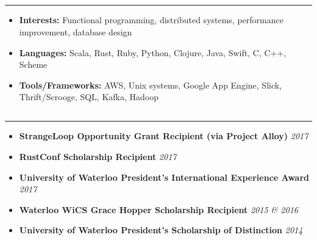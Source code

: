 \documentclass[5pt,letterpaper]{article}
\begin{document}
\subsection*{}
\hrule
\vspace{1.0em}
\begin{itemize}[leftmargin=1em, noitemsep]
  \item[]
    \textbf{Interests:} Functional programming, distributed systems,
    performance improvement, database design
  \item[]
    \textbf{Languages:} Scala, Rust, Ruby, Python, Clojure, Java, Swift, C, C++, Scheme
  \item[]
    \textbf{Tools/Frameworks:} AWS, Unix systems, Google App Engine, Slick,
    Thrift/Scrooge, SQL, Kafka, Hadoop
\end{itemize}

\subsection*{}
\hrule
\vspace{1.0em}
\begin{itemize}[leftmargin=1em, noitemsep]
  \item[] \textbf{StrangeLoop Opportunity Grant Recipient (via Project Alloy)} \hfill \emph{2017}
  \item[] \textbf{RustConf Scholarship Recipient} \hfill \emph{2017}
  \item[] \textbf{University of Waterloo President's International Experience Award} \hfill \emph{2017}
  \item[] \textbf{Waterloo WiCS Grace Hopper Scholarship Recipient} \hfill \emph{2015 \& 2016}
  \item[] \textbf{University of Waterloo President's Scholarship of Distinction} \hfill \emph{2014}
\end{itemize}
\end{document}
